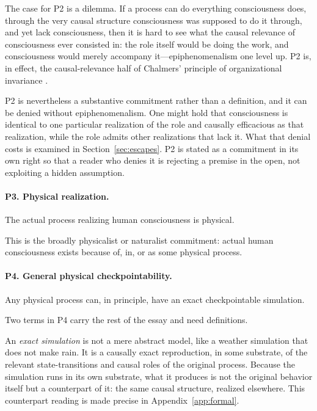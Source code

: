 \documentclass[11pt]{article}
\begin{document}
The case for P2 is a dilemma. If a process can do everything consciousness
does, through the very causal structure consciousness was supposed to do it
through, and yet lack consciousness, then it is hard to see what the causal
relevance of consciousness ever consisted in: the role itself would be doing
the work, and consciousness would merely accompany it---epiphenomenalism one
level up. P2 is, in effect, the causal-relevance half of Chalmers' principle
of organizational invariance \cite{chalmers1996}.

P2 is nevertheless a substantive commitment rather than a definition, and it
can be denied without epiphenomenalism. One might hold that consciousness is
identical to one particular realization of the role and causally efficacious
as that realization, while the role admits other realizations that lack it.
What that denial costs is examined in Section~\ref{sec:escapes}. P2 is stated
as a commitment in its own right so that a reader who denies it is rejecting a
premise in the open, not exploiting a hidden assumption.

\paragraph{P3. Physical realization.}
The actual process realizing human consciousness is physical.

This is the broadly physicalist or naturalist commitment: actual human
consciousness exists because of, in, or as some physical process.

\paragraph{P4. General physical checkpointability.}
Any physical process can, in principle, have an exact checkpointable simulation.

Two terms in P4 carry the rest of the essay and need definitions.

An \emph{exact simulation} is not a mere abstract model, like a weather
simulation that does not make rain. It is a causally exact reproduction, in
some substrate, of the relevant state-transitions and causal roles of the
original process. Because the simulation runs in its own substrate, what it
produces is not the original behavior itself but a counterpart of it: the same
causal structure, realized elsewhere. This counterpart reading is made precise
in Appendix~\ref{app:formal}.
\end{document}
